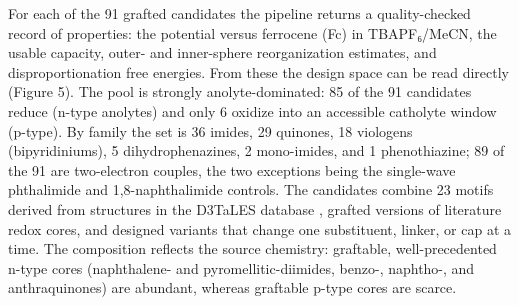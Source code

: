 \documentclass[journal=jcisd8,manuscript=article]{achemso}
\begin{document}
For each of the 91 grafted candidates the pipeline returns a quality-checked record of properties: the potential versus ferrocene (Fc) in TBAPF₆/MeCN, the usable capacity, outer- and inner-sphere reorganization estimates, and disproportionation free energies. From these the design space can be read directly (Figure 5). The pool is strongly anolyte-dominated: 85 of the 91 candidates reduce (n-type anolytes) and only 6 oxidize into an accessible catholyte window (p-type). By family the set is 36 imides, 29 quinones, 18 viologens (bipyridiniums), 5 dihydrophenazines, 2 mono-imides, and 1 phenothiazine; 89 of the 91 are two-electron couples, the two exceptions being the single-wave phthalimide and 1,8-naphthalimide controls. The candidates combine 23 motifs derived from structures in the D3TaLES database \cite{duke2022}, grafted versions of literature redox cores, and designed variants that change one substituent, linker, or cap at a time. The composition reflects the source chemistry: graftable, well-precedented n-type cores (naphthalene- and pyromellitic-diimides, benzo-, naphtho-, and anthraquinones) are abundant, whereas graftable p-type cores are scarce.
\end{document}
